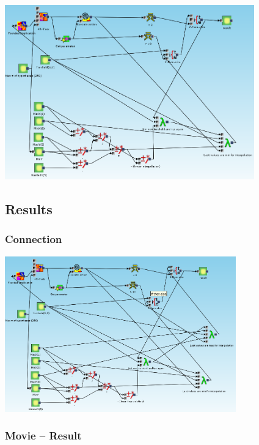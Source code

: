 \documentclass{beamer}
\begin{document}
\begin{frame}
	\frametitle{}
	\includegraphics[width=10.8cm]{exampleWithoutInterpolationOnMax}
\end{frame}

\subsection{Results}
\begin{frame}
	\frametitle{Connection}
	\includegraphics[width=10cm]{exampleResult}
\end{frame}

\begin{frame}
	\frametitle{Movie -- Result}
\end{frame}
\end{document}
